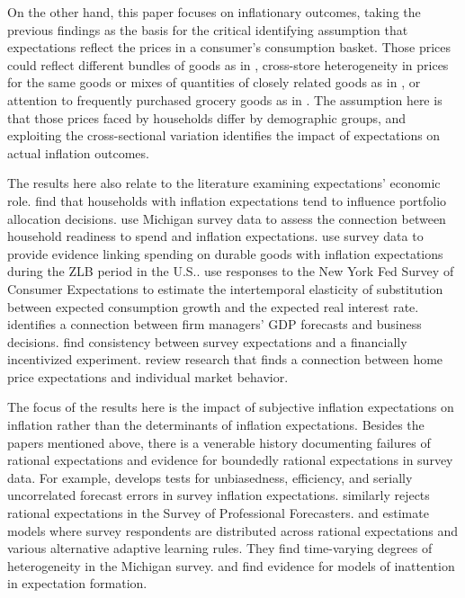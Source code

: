 \documentclass[12pt]{article}
\begin{document}
On the other hand, this paper focuses on inflationary outcomes, taking the previous findings as the basis for the critical identifying assumption that expectations reflect the prices in a consumer's consumption basket. Those prices could reflect different bundles of goods as in \cite{HobijnLagakos:2005}, cross-store heterogeneity in prices for the same goods or mixes of quantities of closely related goods as in \cite{KaplanWohl:JME2017}, or attention to frequently purchased grocery goods as in \cite{Dacunto:groceryJPE}. The assumption here is that those prices faced by households differ by demographic groups, and exploiting the cross-sectional variation identifies the impact of expectations on actual inflation outcomes.

The results here also relate to the literature examining expectations' economic role. \cite{Dacunto:groceryJPE} find that households with inflation expectations tend to influence portfolio allocation decisions. \cite{BachmannBergSims:AEJ2015} use Michigan survey data to assess the connection between household readiness to spend and inflation expectations. \cite{BurkeOzdagli:2022WP} use survey data to provide evidence linking spending on durable goods with inflation expectations during the ZLB period in the U.S.. \cite{CrumpEusepi:2021} use responses to the New York Fed Survey of Consumer Expectations to estimate the intertemporal elasticity of substitution between expected consumption growth and the expected real interest rate. \cite{TanakaBloom:JME2020} identifies a connection between firm managers' GDP forecasts and business decisions.  \cite{Armantieretal:IER2015} find consistency between survey expectations and a financially incentivized experiment. \cite{KuchlerPiazzesiStroebel:2022} review research that finds a connection between home price expectations and individual market behavior.  

The focus of the results here is the impact of subjective inflation expectations on inflation rather than the determinants of inflation expectations. Besides the papers mentioned above, there is a venerable history documenting failures of rational expectations and evidence for boundedly rational expectations in survey data. For example, \cite{EvansGulamani:OBES1984} develops tests for unbiasedness, efficiency, and serially uncorrelated forecast errors in survey inflation expectations. \cite{Carroll:QJE2003} similarly rejects rational expectations in the Survey of Professional Forecasters. \cite{BranchEJ2004} and \cite{Branch:JEDC2007} estimate models where survey respondents are distributed across rational expectations and various alternative adaptive learning rules. They find time-varying degrees of heterogeneity in the Michigan survey. \cite{CoibionGorodnichenko:AER2015} and \cite{CoibionGorodnichenko:JPE2012} find evidence for models of inattention in expectation formation.  
\end{document}
